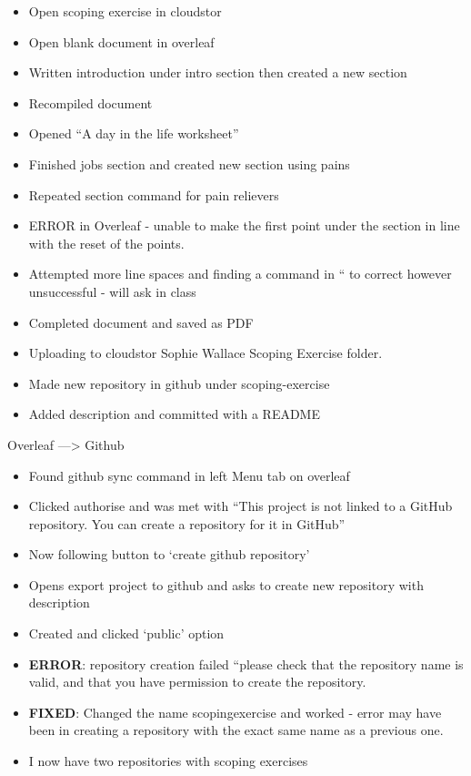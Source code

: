\documentclass{article}
\begin{document}
\begin{itemize}
\item Open scoping exercise in cloudstor
\item Open blank document in overleaf
\item Written introduction under intro section then created a new section
\item Recompiled document 
\item Opened “A day in the life worksheet”
\item Finished jobs section and created new section using pains
\item Repeated section command for pain relievers
\item ERROR in Overleaf - unable to make the first point under the section in line with the reset of the points.
\item Attempted more line spaces and finding a command in “\” to correct however unsuccessful - will ask in class
\item Completed document and saved as PDF
\item Uploading to cloudstor Sophie Wallace Scoping Exercise folder.
\item Made new repository in github under scoping-exercise 
\item Added description and committed with a README
\end{itemize}


Overleaf —> Github

\begin{itemize}
\item Found github sync command in left Menu tab on overleaf
\item Clicked authorise and was met with “This project is not linked to a GitHub repository. You can create a repository for it in GitHub”
\item Now following button to ‘create github repository’
\item Opens export project to github and asks to create new repository with description
\item Created and clicked ‘public’ option
\item \textbf{ERROR}: repository creation failed “please check that the repository name is valid,  and that you have permission to create the repository.
\item \textbf{FIXED}: Changed the name scopingexercise and worked - error may have been in creating a repository with the exact same name as a previous one.
\item I now have two repositories with scoping exercises
\end{itemize}
\end{document}
